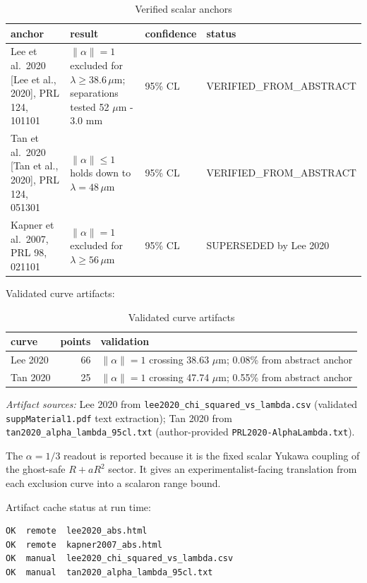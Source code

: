 \documentclass{article}
\begin{document}
\begin{table}[h]
\centering
\begin{tabularx}{\textwidth}{|X|X|X|X|}
\hline
\textbf{anchor} & \textbf{result} & \textbf{confidence} & \textbf{status} \\
\hline
Lee et al.\ 2020 [Lee et al., 2020], PRL 124, 101101 & $\|\alpha\|=1$ excluded for $\lambda\ge38.6\,\mu$m; separations tested 52 $\mu$m - 3.0 mm & 95\% CL & VERIFIED\_FROM\_ABSTRACT \\
\hline
Tan et al.\ 2020 [Tan et al., 2020], PRL 124, 051301 & $\|\alpha\|\le1$ holds down to $\lambda=48\,\mu$m & 95\% CL & VERIFIED\_FROM\_ABSTRACT \\
\hline
Kapner et al.\ 2007, PRL 98, 021101 & $\|\alpha\|=1$ excluded for $\lambda\ge56\,\mu$m & 95\% CL & SUPERSEDED by Lee 2020 \\
\hline
\end{tabularx}
\caption{Verified scalar anchors}
\end{table}

Validated curve artifacts:

\begin{table}[h]
\centering
\begin{tabularx}{\textwidth}{|X|r|X|}
\hline
\textbf{curve} & \textbf{points} & \textbf{validation} \\
\hline
Lee 2020 & 66 & $\|\alpha\|=1$ crossing 38.63 $\mu$m; 0.08\% from abstract anchor \\
\hline
Tan 2020 & 25 & $\|\alpha\|=1$ crossing 47.74 $\mu$m; 0.55\% from abstract anchor \\
\hline
\end{tabularx}
\caption{Validated curve artifacts}
\end{table}

\textit{Artifact sources:} Lee 2020 from \texttt{lee2020\_chi\_squared\_vs\_lambda.csv} (validated \texttt{suppMaterial1.pdf} text extraction); Tan 2020 from \texttt{tan2020\_alpha\_lambda\_95cl.txt} (author-provided \texttt{PRL2020-AlphaLambda.txt}).

The $\alpha=1/3$ readout is reported because it is the fixed scalar Yukawa
coupling of the ghost-safe $R+aR^2$ sector. It gives an experimentalist-facing
translation from each exclusion curve into a scalaron range bound.

Artifact cache status at run time:

\begin{lstlisting}
OK  remote  lee2020_abs.html
OK  remote  kapner2007_abs.html
OK  manual  lee2020_chi_squared_vs_lambda.csv
OK  manual  tan2020_alpha_lambda_95cl.txt
\end{lstlisting}
\end{document}

